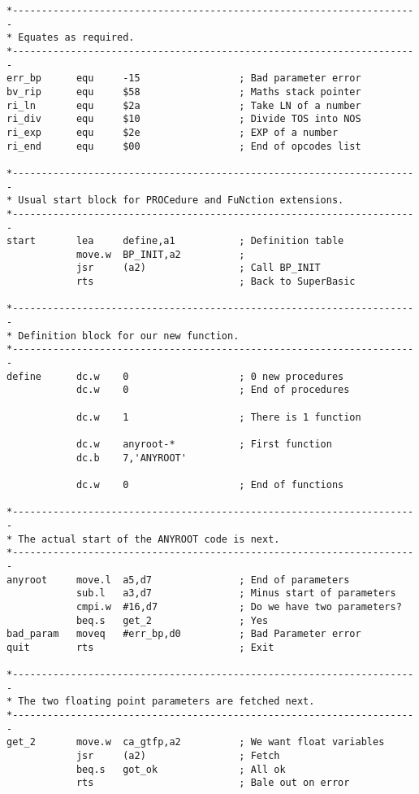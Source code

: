 \begin{lstlisting}[firstnumber=1,caption={The Maths Package - Calculate Any Root},label={lst:MathsPackageAnyRoot}]
*----------------------------------------------------------------------
* Equates as required.
*----------------------------------------------------------------------
err_bp      equ     -15                 ; Bad parameter error
bv_rip      equ     $58                 ; Maths stack pointer
ri_ln       equ     $2a                 ; Take LN of a number
ri_div      equ     $10                 ; Divide TOS into NOS
ri_exp      equ     $2e                 ; EXP of a number
ri_end      equ     $00                 ; End of opcodes list

*----------------------------------------------------------------------
* Usual start block for PROCedure and FuNction extensions.
*----------------------------------------------------------------------
start       lea     define,a1           ; Definition table
            move.w  BP_INIT,a2          ; 
            jsr     (a2)                ; Call BP_INIT
            rts                         ; Back to SuperBasic

*----------------------------------------------------------------------
* Definition block for our new function.
*----------------------------------------------------------------------
define      dc.w    0                   ; 0 new procedures
            dc.w    0                   ; End of procedures

            dc.w    1                   ; There is 1 function

            dc.w    anyroot-*           ; First function
            dc.b    7,'ANYROOT'

            dc.w    0                   ; End of functions

*----------------------------------------------------------------------
* The actual start of the ANYROOT code is next.
*----------------------------------------------------------------------
anyroot     move.l  a5,d7               ; End of parameters
            sub.l   a3,d7               ; Minus start of parameters
            cmpi.w  #16,d7              ; Do we have two parameters?
            beq.s   get_2               ; Yes
bad_param   moveq   #err_bp,d0          ; Bad Parameter error
quit        rts                         ; Exit

*----------------------------------------------------------------------
* The two floating point parameters are fetched next.
*----------------------------------------------------------------------
get_2       move.w  ca_gtfp,a2          ; We want float variables
            jsr     (a2)                ; Fetch
            beq.s   got_ok              ; All ok
            rts                         ; Bale out on error


\end{lstlisting}
